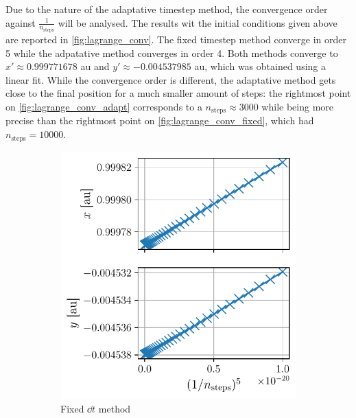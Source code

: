Due to the nature of the adaptative timestep method, the convergence order against \(\frac{1}{n_\textrm{steps}}\) will be analysed. The results wit the initial conditions given above are reported in \autoref{fig:lagrange_conv}. The fixed timestep method converge in order 5 while the adpatative method converges in order 4. Both methods converge to \(x' \approx 0.999771678\) au and \(y' \approx -0.004537985\) au, which was obtained using a linear fit. While the convergence order is different, the adaptative method gets close to the final position for a much smaller amount of steps: the rightmost point on \autoref{fig:lagrange_conv_adapt} corresponds to a \(n_\textrm{steps} \approx 3000\) while being more precise than the rightmost point on \autoref{fig:lagrange_conv_fixed}, which had \(n_\textrm{steps} = 10000\).
\begin{figure}[h]
    \centering
    \begin{subfigure}{0.45\linewidth}
        \centering
        \includegraphics[width=\linewidth]{figures/lagrange_convergence_fixed.pdf}
        \caption{Fixed \(\dd t\) method}
        \label{fig:lagrange_conv_fixed}
    \end{subfigure}
    \begin{subfigure}{0.49\linewidth}
        \centering

\end{subfigure}
\end{figure}

